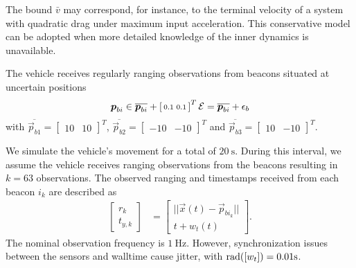 \documentclass{ifacconf}
\begin{document}
\begin{remark}
  The bound $\bar{v}$ may correspond, for instance, to the terminal velocity of a system with quadratic drag under maximum input acceleration. This conservative model can be adopted when more detailed knowledge of the inner dynamics is unavailable.
\end{remark}

The vehicle receives regularly ranging observations from beacons situated at uncertain positions
\begin{align}
  \boldsymbol{p}_{bi} \in
  \overline{\boldsymbol{p}_{bi}}+
 \left[\begin{smallmatrix}
    0.1& 0.1
  \end{smallmatrix}\right]^T
  \mathcal{E} =\overline{\boldsymbol{p}_{bi}} +
  \epsilon_b
\end{align}
with $\overline{\vec{p}_{b1}}=\left[\begin{smallmatrix}
    10& 10
\end{smallmatrix}\right]^T$,
$\overline{\vec{p}_{b2}}=\left[\begin{smallmatrix}
    -10& -10
\end{smallmatrix}\right]^T$ and
$\overline{\vec{p}_{b3}}=\left[\begin{smallmatrix}
    10& -10
\end{smallmatrix}\right]^T$.

We simulate the vehicle's movement for a total of $\qty{20}{\second}$.
During this interval, we assume the vehicle receives ranging observations from the beacons resulting in $k=63$ observations.
The observed ranging and timestamps received from each beacon $i_k$ are described as
\begin{align}
  \left[\begin{smallmatrix}
    r_k \\ t_{y,k}
  \end{smallmatrix}\right]
  &=
    \left[\begin{smallmatrix}
      ||\vec{x}(t) - \vec{p}_{b i_k} || \\
      t + w_t(t)
    \end{smallmatrix}\right].
    \label{eq:mn_h}
\end{align}
The nominal observation frequency is $\qty{1}{\Hz}$.
However, synchronization issues between the sensors and walltime cause jitter, with ${\rad{[w_t]}=0.01\unit{\s}}$.
\end{document}
